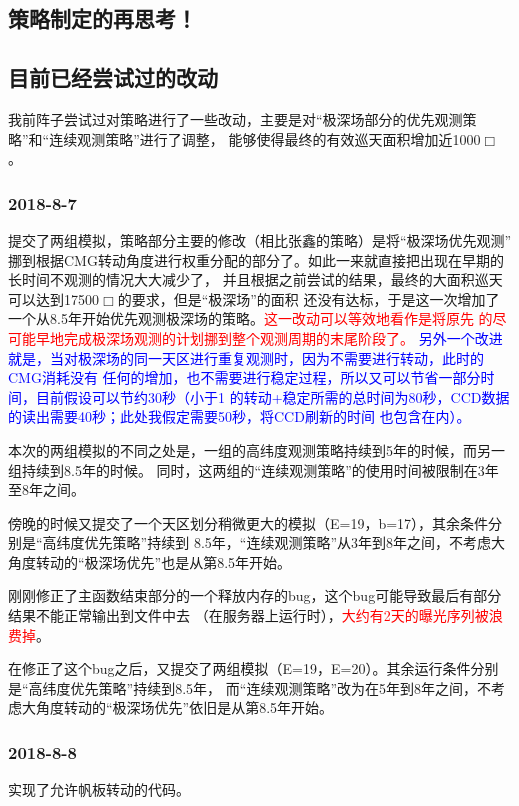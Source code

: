\documentclass[a4paper,11pt]{ctexart}
\newcommand{\RT}[1]{\textcolor{red}{#1}}
\newcommand{\BT}[1]{\textcolor{blue}{#1}}
\begin{document}
\subsection{策略制定的再思考！}


\subsection{目前已经尝试过的改动}
我前阵子尝试过对策略进行了一些改动，主要是对“极深场部分的优先观测策略”和“连续观测策略”进行了调整，
能够使得最终的有效巡天面积增加近1000$\Box$\textdegree 。

\subsubsection{2018-8-7}

提交了两组模拟，策略部分主要的修改（相比张鑫的策略）是将“极深场优先观测”
挪到根据CMG转动角度进行权重分配的部分了。如此一来就直接把出现在早期的长时间不观测的情况大大减少了，
并且根据之前尝试的结果，最终的大面积巡天可以达到17500$\Box$\textdegree 的要求，但是“极深场”的面积
还没有达标，于是这一次增加了一个从8.5年开始优先观测极深场的策略。\RT{这一改动可以等效地看作是将原先
的尽可能早地完成极深场观测的计划挪到整个观测周期的末尾阶段了。}
\BT{另外一个改进就是，当对极深场的同一天区进行重复观测时，因为不需要进行转动，此时的CMG消耗没有
任何的增加，也不需要进行稳定过程，所以又可以节省一部分时间，目前假设可以节约30秒（小于1\textdegree
的转动+稳定所需的总时间为80秒，CCD数据的读出需要40秒；此处我假定需要50秒，将CCD刷新的时间
也包含在内）。}

本次的两组模拟的不同之处是，一组的高纬度观测策略持续到5年的时候，而另一组持续到8.5年的时候。
同时，这两组的“连续观测策略”的使用时间被限制在3年至8年之间。

傍晚的时候又提交了一个天区划分稍微更大的模拟（E=19，b=17），其余条件分别是“高纬度优先策略”持续到
8.5年，“连续观测策略”从3年到8年之间，不考虑大角度转动的“极深场优先”也是从第8.5年开始。

刚刚修正了主函数结束部分的一个释放内存的bug，这个bug可能导致最后有部分结果不能正常输出到文件中去
（在服务器上运行时），\RT{大约有2天的曝光序列被浪费掉}。

在修正了这个bug之后，又提交了两组模拟（E=19，E=20）。其余运行条件分别是“高纬度优先策略”持续到8.5年，
而“连续观测策略”改为在5年到8年之间，不考虑大角度转动的“极深场优先”依旧是从第8.5年开始。

\subsubsection{2018-8-8}
实现了允许帆板转动的代码。
\end{document}
